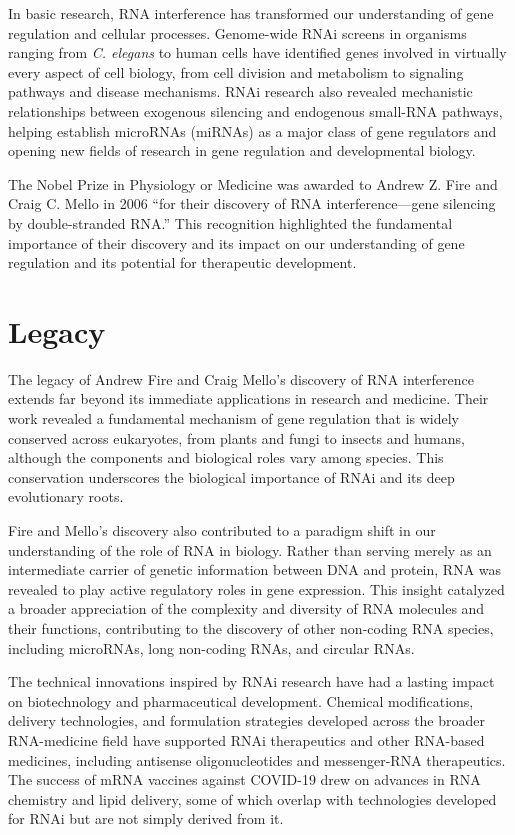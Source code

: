 In basic research, RNA interference has transformed our understanding of gene regulation and cellular processes. Genome-wide RNAi screens in organisms ranging from \textit{C. elegans} to human cells have identified genes involved in virtually every aspect of cell biology, from cell division and metabolism to signaling pathways and disease mechanisms. RNAi research also revealed mechanistic relationships between exogenous silencing and endogenous small-RNA pathways, helping establish microRNAs (miRNAs) as a major class of gene regulators and opening new fields of research in gene regulation and developmental biology.

The Nobel Prize in Physiology or Medicine was awarded to Andrew Z. Fire and Craig C. Mello in 2006 ``for their discovery of RNA interference---gene silencing by double-stranded RNA.'' This recognition highlighted the fundamental importance of their discovery and its impact on our understanding of gene regulation and its potential for therapeutic development.

\section{Legacy}

The legacy of Andrew Fire and Craig Mello's discovery of RNA interference extends far beyond its immediate applications in research and medicine. Their work revealed a fundamental mechanism of gene regulation that is widely conserved across eukaryotes, from plants and fungi to insects and humans, although the components and biological roles vary among species. This conservation underscores the biological importance of RNAi and its deep evolutionary roots.

Fire and Mello's discovery also contributed to a paradigm shift in our understanding of the role of RNA in biology. Rather than serving merely as an intermediate carrier of genetic information between DNA and protein, RNA was revealed to play active regulatory roles in gene expression. This insight catalyzed a broader appreciation of the complexity and diversity of RNA molecules and their functions, contributing to the discovery of other non-coding RNA species, including microRNAs, long non-coding RNAs, and circular RNAs.

The technical innovations inspired by RNAi research have had a lasting impact on biotechnology and pharmaceutical development. Chemical modifications, delivery technologies, and formulation strategies developed across the broader RNA-medicine field have supported RNAi therapeutics and other RNA-based medicines, including antisense oligonucleotides and messenger-RNA therapeutics. The success of mRNA vaccines against COVID-19 drew on advances in RNA chemistry and lipid delivery, some of which overlap with technologies developed for RNAi but are not simply derived from it.

